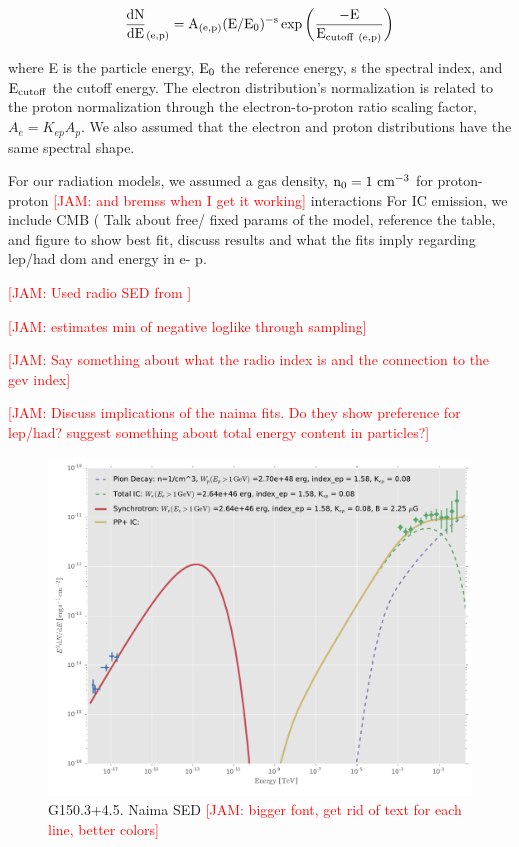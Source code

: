 \documentclass[iop]{emulateapj}
\newcommand{\kibitz}[2]{\ifnum\Comments=1\textcolor{#1}{#2}\fi}
\newcommand{\jamie}[1]{\kibitz{red}      {[JAM: #1]}}
\newcommand{\gam}{$\gamma$-ray}
\newcommand{\Gone}{G150.3+4.5}
\begin{document}
\begin{equation}\label{eq:ecpl}
{\rm \frac{dN}{dE}_{(e,p)} = A_{(e,p)} (E / E_0) ^{-s} \exp {\bigg ( }\frac{- E}{ E_{cutoff~(e,p)}}{\bigg)}}
\end{equation}

where E is the particle energy, ${\rm E_0}$ the reference energy, s the spectral index, and ${\rm E_{cutoff}}$ the cutoff energy. The electron distribution's normalization is related to the proton normalization through the electron-to-proton ratio scaling factor, $A_e = K_{ep} A_p$. We also assumed that the electron and proton distributions have the same spectral shape.

For our radiation models, we assumed a gas density, ${\rm n_0 = 1~cm^{-3}}$ for proton-proton \jamie{and bremss when I get it working} interactions For IC emission, we include CMB  (
Talk about free/ fixed params of the model, reference the table, and figure to show best fit, discuss results and what the fits imply regarding lep/had dom and energy in e- p.

\jamie{Used radio SED from \citep{Gerbrandt14}}



\jamie{estimates min of negative loglike through sampling}	

\jamie{Say something about what the radio index is and the connection to the gev index}


\jamie{Discuss implications of the naima fits. Do they show preference for lep/had? suggest something about total energy content in particles?}



\begin{figure}[!ht]
	\begin{centering}
		\includegraphics[width=\columnwidth]{Figures/G150_ICsync_PP_SED.pdf}
		\caption{ \Gone. Naima SED \jamie{bigger font, get rid of text for each line, better colors}}
			\label{fig:naimaSED}
	\end{centering}
\end{figure}
\end{document}
